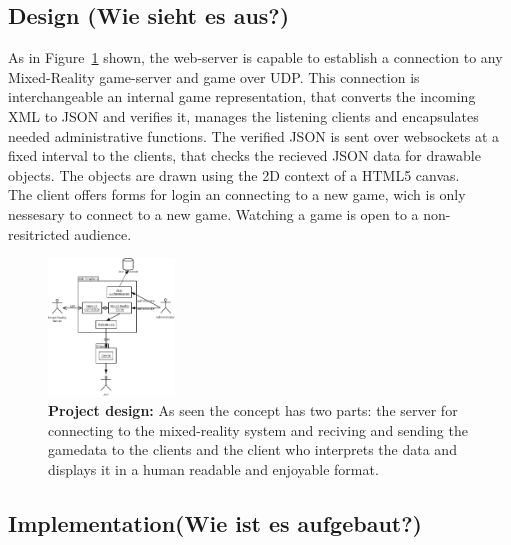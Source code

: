 \documentclass[journal]{IEEEtran}
\begin{document}
\subsection{Design (Wie sieht es aus?)}
As in Figure~\ref{fig:proj_design} shown, the web-server is capable to establish
a connection to any Mixed-Reality game-server and game over UDP. This connection
is interchangeable an internal game representation, that converts the incoming
XML to JSON and verifies it, manages the listening clients and encapsulates
needed administrative functions. The verified JSON is sent over websockets at a
fixed interval to the clients, that checks the recieved JSON data for drawable
objects. The objects are drawn using the 2D context of a HTML5
canvas\cite{w3c-canvas}.\\
The client offers forms for login an connecting to a new game, wich is only
nessesary to connect to a new game. Watching a game is open to a non-resitricted
audience.
\begin{figure}[!t]
    \centering
    \includegraphics[width=0.3\textwidth]{design.png}
    \caption{\textbf{Project design:} As seen the concept has two parts: the server for connecting to the mixed-reality system and reciving and sending the gamedata to the clients and the client who interprets the data and displays it in a human readable and enjoyable format.}
    \label{fig:proj_design}
\end{figure}
\subsection{Implementation(Wie ist es aufgebaut?)}
\end{document}
